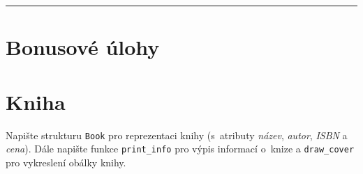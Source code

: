 \documentclass[12pt,a4paper]{article}
\begin{document}
\noindent\rule{\textwidth}{1pt}
\section*{Bonusové úlohy}

\section{Kniha}

Napište strukturu \texttt{Book} pro reprezentaci knihy (s atributy
\textit{název}, \textit{autor}, \textit{ISBN} a \textit{cena}).  Dále napište
funkce \texttt{print\_info} pro výpis informací o knize a \texttt{draw\_cover}
pro vykreslení obálky knihy.
\end{document}

